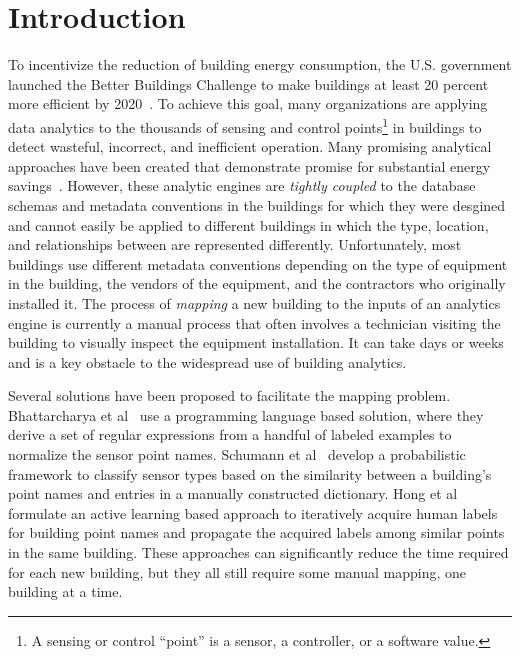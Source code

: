 \section{Introduction}

To incentivize the reduction of building energy consumption, the U.S. government
launched the Better Buildings Challenge to make buildings at least 20 percent
more efficient by 2020~\cite{doe2013better}. To achieve this goal, many
organizations are applying data analytics to the thousands of sensing and
control points\footnote{A sensing or control ``point'' is a sensor, a
  controller, or a software value.} in buildings to detect wasteful, incorrect,
and inefficient operation.  Many promising analytical approaches have been
created that demonstrate promise for substantial energy savings~\cite{find}.
However, these analytic engines are \emph{tightly coupled} to the database
schemas and metadata conventions in the buildings for which they were desgined
and cannot easily be applied to different buildings in which the type, location,
and relationships between are represented differently. Unfortunately, most
buildings use different metadata conventions depending on the type of equipment
in the building, the vendors of the equipment, and the contractors who
originally installed it. The process of {\em mapping} a new building to the
inputs of an analytics engine is currently a manual process that often involves
a technician visiting the building to visually inspect the equipment
installation. It can take days or weeks and is a key obstacle to the widespread
use of building analytics.

Several solutions have been proposed to facilitate the mapping problem.
Bhattarcharya et al~\cite{arka} use a programming language based solution,
where they derive a set of regular expressions from a handful of labeled examples
to normalize the sensor point names.
Schumann et al~\cite{ibm} develop a probabilistic framework to classify sensor types
based on the similarity between a building's point names and entries in a manually constructed dictionary.
Hong et al~\cite{cikm} formulate an active learning based approach to
iteratively acquire human labels for building point names and propagate the
acquired labels among similar points in the same building.  These approaches can
significantly reduce the time required for each new building, but they all still
require some manual mapping, one building at a time.

